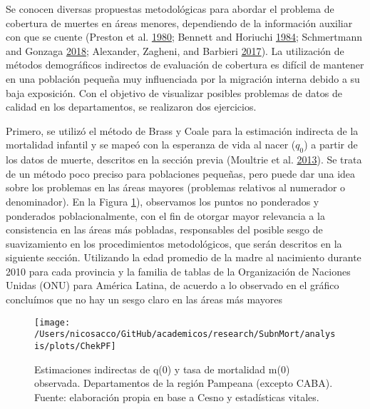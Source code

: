 \documentclass[12pt,]{article}
\begin{document}
Se conocen diversas propuestas metodológicas para abordar el problema de
cobertura de muertes en áreas menores, dependiendo de la información
auxiliar con que se cuente (Preston et al.
\protect\hyperlink{ref-Preston1980}{1980}; Bennett and Horiuchi
\protect\hyperlink{ref-Bennett_Horiuchi_1984}{1984}; Schmertmann and
Gonzaga \protect\hyperlink{ref-Schmertmann2018}{2018}; Alexander,
Zagheni, and Barbieri \protect\hyperlink{ref-Alexander2017}{2017}). La
utilización de métodos demográficos indirectos de evaluación de
cobertura es difícil de mantener en una población pequeña muy
influenciada por la migración interna debido a su baja exposición. Con
el objetivo de visualizar posibles problemas de datos de calidad en los
departamentos, se realizaron dos ejercicios.

Primero, se utilizó el método de Brass y Coale para la estimación
indirecta de la mortalidad infantil y se mapeó con la esperanza de vida
al nacer (\(q_0\)) a partir de los datos de muerte, descritos en la
sección previa (Moultrie et al. \protect\hyperlink{ref-Moultrie}{2013}).
Se trata de un método poco preciso para poblaciones pequeñas, pero puede
dar una idea sobre los problemas en las áreas mayores (problemas
relativos al numerador o denominador). En la Figura \ref{fig:PF}),
observamos los puntos no ponderados y ponderados poblacionalmente, con
el fin de otorgar mayor relevancia a la consistencia en las áreas más
pobladas, responsables del posible sesgo de suavizamiento en los
procedimientos metodológicos, que serán descritos en la siguiente
sección. Utilizando la edad promedio de la madre al nacimiento durante
2010 para cada provincia y la familia de tablas de la Organización de
Naciones Unidas (ONU) para América Latina, de acuerdo a lo observado en
el gráfico concluímos que no hay un sesgo claro en las áreas más mayores

\begin{figure}

{\centering \texttt{[image: /Users/nicosacco/GitHub/academicos/research/SubnMort/analysis/plots/ChekPF]} 

}

\caption{Estimaciones indirectas de q(0) y tasa de mortalidad m(0) observada. Departamentos de la región Pampeana (excepto CABA). Fuente: elaboración propia en base a Cesno y estadísticas vitales.}\label{fig:PF}
\end{figure}
\end{document}
